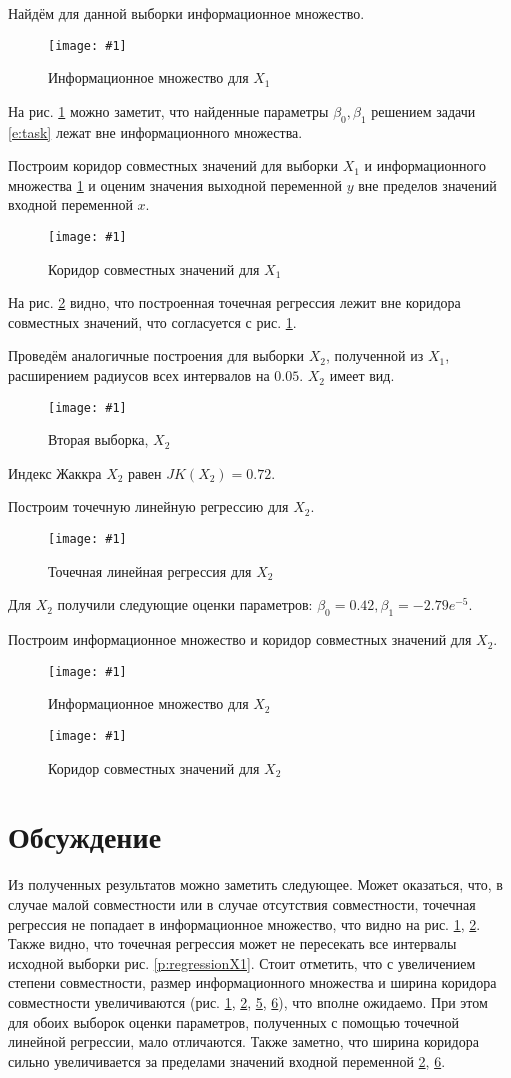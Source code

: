 \documentclass[a4paper,12pt]{article}
\newcommand{\plot}[3]{
    \begin{figure}[H]
        \begin{center}
            \texttt{[image: \#1]}
            \caption{#2}
            \label{#3}
        \end{center}
    \end{figure}
}
\begin{document}
    Найдём для данной выборки информационное множество.
    \plot{InformSetX1}{Информационное множество для $ X_1 $}{p:informSetX1}

    На рис. \ref{p:informSetX1} можно заметит, что найденные параметры
    $ \beta_0, \beta_1 $ решением задачи \ref{e:task} лежат вне информационного множества.

    Построим коридор совместных значений для выборки $ X_1 $ и информационного множества \ref{p:informSetX1}
    и оценим значения выходной переменной $ y $ вне пределов значений входной переменной $ x $.
    \plot{InformSetCorridorX1}{Коридор совместных значений для $ X_1 $}{p:informSetCorridorX1}

    На рис. \ref{p:informSetCorridorX1} видно, что построенная точечная регрессия лежит вне коридора совместных значений,
    что согласуется с рис. \ref{p:informSetX1}.

    Проведём аналогичные построения для выборки $ X_2 $, полученной из $ X_1 $, расширением радиусов
    всех интервалов на $ 0.05 $. $ X_2 $ имеет вид.
    \plot{X2}{Вторая выборка, $ X_2 $}{p:sampleX2}
    
    Индекс Жаккра $ X_2 $ равен $ JK(X_2) = 0.72 $.

    Построим точечную линейную регрессию для $ X_2 $.
    \plot{PointRegressionX2}{Точечная линейная регрессия для $ X_2 $}{p:regressionX2}

    Для $ X_2 $ получили следующие оценки параметров: $ \beta_0 = 0.42, \beta_1 = -2.79e^{-5} $.

    Построим информационное множество и коридор совместных значений для $ X_2 $.

    \plot{InformSetX2}{Информационное множество для $ X_2 $}{p:informSetX2}
    \plot{InformSetCorridorX2}{Коридор совместных значений для $ X_2 $}{p:informSetCorridorX2}

    \section{Обсуждение}
    \quad Из полученных результатов можно заметить следующее.
    Может оказаться, что, в случае малой совместности или в случае отсутствия совместности,
    точечная регрессия не попадает в информационное множество,
    что видно на рис. \ref{p:informSetX1}, \ref{p:informSetCorridorX1}.
    Также видно, что точечная регрессия может не пересекать все интервалы исходной выборки рис. \ref{p:regressionX1}.
    Стоит отметить, что с увеличением степени совместности, размер информационного множества и
    ширина коридора совместности увеличиваются
    (рис. \ref{p:informSetX1}, \ref{p:informSetCorridorX1}, \ref{p:informSetX2}, \ref{p:informSetCorridorX2}),
    что вполне ожидаемо.
    При этом для обоих выборок оценки параметров, полученных с помощью точечной линейной регрессии, мало отличаются.
    Также заметно, что ширина коридора сильно увеличивается за пределами
    значений входной переменной \ref{p:informSetCorridorX1}, \ref{p:informSetCorridorX2}.
\end{document}
